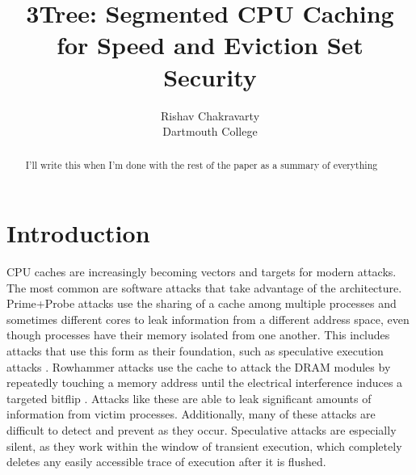 \documentclass[letterpaper, twocolumn]{article}
\begin{document}

\date{}

\title{3Tree: Segmented CPU Caching for Speed and Eviction Set
  Security}

\author{
{\rm Rishav Chakravarty}\\
Dartmouth College
} %

\maketitle

\begin{abstract}

I'll write this when I'm done with the rest of the paper as a summary of everything
\end{abstract}

\section{Introduction}

CPU caches are increasingly becoming vectors and targets for modern attacks.
The most common are software attacks that take advantage of the architecture.
Prime+Probe attacks use the sharing of a cache among multiple processes and sometimes different cores
to leak information from a different address space,
even though processes have their memory isolated from one another.
This includes attacks that use this form as their foundation,
such as speculative execution attacks
\cite{Gofetch}
\cite{Spectre}
\cite{TikTag}
\cite{PACMan}
\cite{SPAM}
\cite{LeakyWay}
\cite{Streamline}
\cite{TransientAttackSurvey}.
Rowhammer attacks use the cache to attack the DRAM modules
by repeatedly touching a memory address until the electrical interference induces a targeted bitflip
\cite{Rowhammer}.
Attacks like these are able to leak significant amounts of information from victim processes.
Additionally, many of these attacks are difficult to detect and prevent as they occur.
Speculative attacks are especially silent,
as they work within the window of transient execution,
which completely deletes any easily accessible trace of execution after it is flushed.
\end{document}
